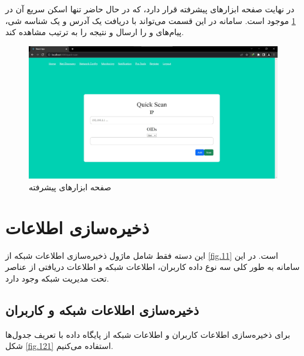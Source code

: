 

در نهایت صفحه ابزارهای پیشرفته قرار دارد، که در حال حاضر تنها اسکن سریع آن در \cref{fig.120} موجود است. سامانه در این قسمت می‌تواند با دریافت یک آدرس و یک شناسه شی، پیام‌های  و  را ارسال و نتیجه را به ترتیب مشاهده کند. 

\begin{figure}[!h]
    \centering\includegraphics[scale=.38]{./pro-tools}
    \caption{صفحه ابزارهای پیشرفته}\label{fig.120}
\end{figure}



\cleardoublepage

\section{ذخیره‌سازی اطلاعات}

این دسته فقط شامل ماژول ذخیره‌سازی اطلاعات شبکه از \cref{fig.11} است. در این سامانه به طور کلی سه نوع داده کاربران، اطلاعات شبکه و اطلاعات دریافتی از عناصر تحت مدیریت شبکه وجود دارد. 



\subsection{ذخیره‌سازی اطلاعات شبکه و کاربران}

برای ذخیره‌سازی اطلاعات کاربران و اطلاعات شبکه از پایگاه داده  با تعریف جدول‌ها شکل \cref{fig.121} استفاده می‌کنیم.

